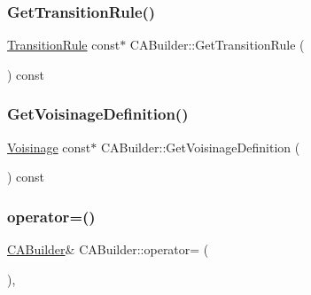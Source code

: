 \mbox{\label{class_c_a_builder_a39da3ad55920be3648c8353f17d12bed}} 
\subsubsection{\texorpdfstring{Get\+Transition\+Rule()}{GetTransitionRule()}}
{\footnotesize\ttfamily \mbox{\hyperlink{class_transition_rule}{Transition\+Rule}} const$\ast$ C\+A\+Builder\+::\+Get\+Transition\+Rule (\begin{DoxyParamCaption}{ }\end{DoxyParamCaption}) const\hspace{0.3cm}{\ttfamily [inline]}}

\mbox{\label{class_c_a_builder_a1be1b3d758b2aa2f5798680a8264ca1e}} 
\subsubsection{\texorpdfstring{Get\+Voisinage\+Definition()}{GetVoisinageDefinition()}}
{\footnotesize\ttfamily \mbox{\hyperlink{class_voisinage}{Voisinage}} const$\ast$ C\+A\+Builder\+::\+Get\+Voisinage\+Definition (\begin{DoxyParamCaption}{ }\end{DoxyParamCaption}) const\hspace{0.3cm}{\ttfamily [inline]}}

\mbox{\label{class_c_a_builder_a96af5f657cd2b3bebb17c9ce730583a0}} 
\subsubsection{\texorpdfstring{operator=()}{operator=()}}
{\footnotesize\ttfamily \mbox{\hyperlink{class_c_a_builder}{C\+A\+Builder}}\& C\+A\+Builder\+::operator= (\begin{DoxyParamCaption}\item[{const \mbox{\hyperlink{class_c_a_builder}{C\+A\+Builder}} \&}]{ }\end{DoxyParamCaption})\hspace{0.3cm}{\ttfamily [protected]}, {\ttfamily [delete]}}



